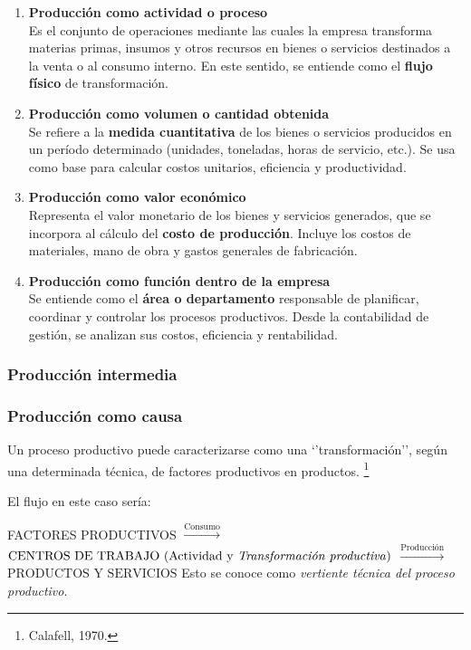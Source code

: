 \documentclass[12pt]{report} %
\begin{document}
\begin{enumerate}
\def\labelenumi{\arabic{enumi}.}
\item
  \textbf{Producción como actividad o proceso}\\
  Es el conjunto de operaciones mediante las cuales la empresa
  transforma materias primas, insumos y otros recursos en bienes o
  servicios destinados a la venta o al consumo interno. En este sentido,
  se entiende como el \textbf{flujo físico} de transformación.
\item
  \textbf{Producción como volumen o cantidad obtenida}\\
  Se refiere a la \textbf{medida cuantitativa} de los bienes o servicios
  producidos en un período determinado (unidades, toneladas, horas de
  servicio, etc.). Se usa como base para calcular costos unitarios,
  eficiencia y productividad.
\item
  \textbf{Producción como valor económico}\\
  Representa el valor monetario de los bienes y servicios generados, que
  se incorpora al cálculo del \textbf{costo de producción}. Incluye los
  costos de materiales, mano de obra y gastos generales de fabricación.
\item
  \textbf{Producción como función dentro de la empresa}\\
  Se entiende como el \textbf{área o departamento} responsable de
  planificar, coordinar y controlar los procesos productivos. Desde la
  contabilidad de gestión, se analizan sus costos, eficiencia y
  rentabilidad.
\end{enumerate}

\subsubsection*{Producción intermedia}


\subsubsection*{Producción como causa}

Un proceso productivo puede caracterizarse como una `'transformación'',
según una determinada técnica, de factores productivos en productos.
\footnote{Calafell, 1970.}

El flujo en este caso sería:

FACTORES PRODUCTIVOS \(\xrightarrow{\text{Consumo}}\)
\(\text{CENTROS DE TRABAJO (Actividad y \textit{Transformación productiva})}\)
\(\xrightarrow{\text{Producción}}\) \(\text{PRODUCTOS Y SERVICIOS}\)
Esto se conoce como \emph{vertiente técnica del proceso productivo}.
\end{document}
